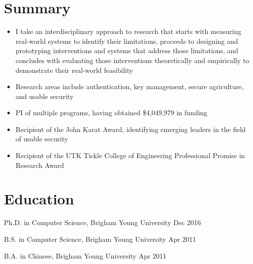 \documentclass[application,cv]{cv}
\begin{document}
	

\maketitle

\section{Summary}

\begin{itemize}
	\item I take an interdisciplinary approach to research that starts with measuring real-world systems to identify their limitations, proceeds to designing and prototyping interventions and systems that address those limitations, and  concludes with evaluating those interventions theoretically and empirically to demonstrate their real-world feasibility
	\item Research areas include authentication, key management, secure agriculture, and usable security
	\item PI of multiple programs, having obtained \$4,049,979 in funding
	\item Recipient of the John Karat Award, identifying emerging leaders in the field of usable security
	\item Recipient of the UTK Tickle College of Engineering Professional Promise in Research Award
	
\end{itemize}


\section{Education}

\makeatletter

\cv@twoColumnItemRight
	{{\cv@itemTitleStyle Ph.D. in Computer Science}, {\cv@itemSubtitleStyle Brigham Young University}}
	{{\cv@itemExtraInfoStyle Dec 2016}}
\vspace{\itemsep}
	
\cv@twoColumnItemRight
	{{\cv@itemTitleStyle B.S. in Computer Science}, {\cv@itemSubtitleStyle Brigham Young University}}
	{{\cv@itemExtraInfoStyle Apr 2011}}
\vspace{\itemsep}

\cv@twoColumnItemRight
	{{\cv@itemTitleStyle B.A. in Chinese}, {\cv@itemSubtitleStyle Brigham Young University}}
	{{\cv@itemExtraInfoStyle Apr 2011}}
\end{document}
